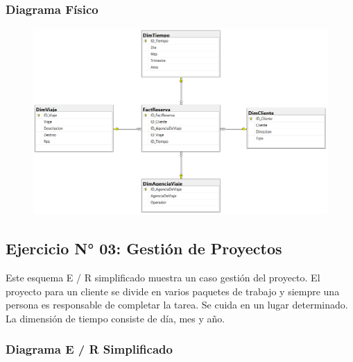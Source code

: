 \documentclass[12pt,letterpaper]{article}
\begin{document}
\newpage
\subsubsection{\textbf{Diagrama Físico }}

	\begin{figure}[htb]
		\begin{center}
			\includegraphics[width=15cm]{./Imagenes/Ejercicio2_DiagramaFisico}
			
		\end{center}
	\end{figure}

\newpage


\subsection{Ejercicio N° 03: Gestión de Proyectos}

Este esquema E / R simplificado muestra un caso gestión del proyecto. El proyecto para un cliente se divide en varios paquetes de trabajo y siempre una persona es responsable de completar la tarea. Se cuida en un lugar determinado. La dimensión de tiempo consiste de día, mes y año.

\subsubsection{\textbf{Diagrama E / R Simplificado}}
\end{document}
